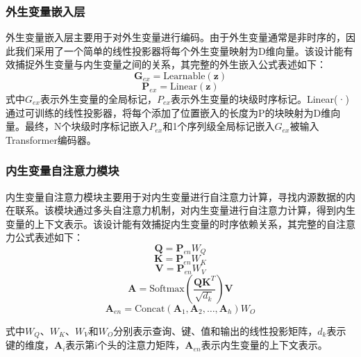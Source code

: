 \documentclass[12pt]{article}
\begin{document}
\subsubsection*{外生变量嵌入层}

外生变量嵌入层主要用于对外生变量进行编码。由于外生变量通常是非时序的，因此我们采用了一个简单的线性投影器将每个外生变量映射为D维向量。该设计能有效捕捉外生变量与内生变量之间的关系，其完整的外生嵌入公式表述如下：
\begin{equation*}
    \mathbf{G}_{ex} = \text{Learnable}(\mathbf{z})
\end{equation*}
\begin{equation}
    \mathbf{P}_{ex} = \text{Linear}(\mathbf{z})
\end{equation}
式中$G_{ex}$表示外生变量的全局标记，$P_{ex}$表示外生变量的块级时序标记。Linear(·)通过可训练的线性投影器，将每个添加了位置嵌入的长度为P的块映射为D维向量。最终，N个块级时序标记嵌入$P_{ex}$和1个序列级全局标记嵌入$G_{ex}$被输入Transformer编码器。
\subsubsection*{内生变量自注意力模块}
内生变量自注意力模块主要用于对内生变量进行自注意力计算，寻找内源数据的内在联系。该模块通过多头自注意力机制，对内生变量进行自注意力计算，得到内生变量的上下文表示。该设计能有效捕捉内生变量的时序依赖关系，其完整的自注意力公式表述如下：
\begin{equation*}
    \mathbf{Q} = \mathbf{P}_{en}W_Q
\end{equation*}
\begin{equation*}
    \mathbf{K} = \mathbf{P}_{en}W_K
\end{equation*}
\begin{equation}
    \mathbf{V} = \mathbf{P}_{en}W_V
\end{equation}
\begin{equation*}
    \mathbf{A} = \text{Softmax}\left(\frac{\mathbf{Q}\mathbf{K}^T}{\sqrt{d_k}}\right)\mathbf{V}
\end{equation*}
\begin{equation*}
    \mathbf{A}_{en} = \text{Concat}(\mathbf{A}_1, \mathbf{A}_2, \ldots, \mathbf{A}_h)W_O
\end{equation*}

式中$W_Q$、$W_K$、$W_V$和$W_O$分别表示查询、键、值和输出的线性投影矩阵，$d_k$表示键的维度，$\mathbf{A}_i$表示第i个头的注意力矩阵，$\mathbf{A}_{en}$表示内生变量的上下文表示。
\end{document}
